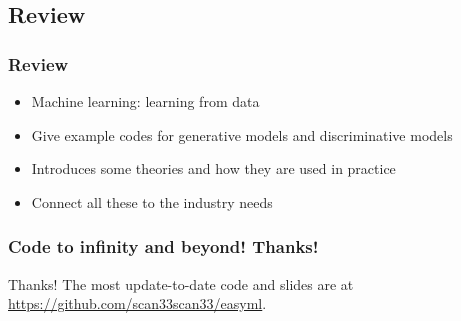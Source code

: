 \documentclass{beamer}
\begin{document}
\subsection{Review}
\begin{frame}
  \frametitle{Review}
  \begin{itemize}
  \item Machine learning: learning from data
  \item Give example codes for generative models and discriminative models
  \item Introduces some theories and how they are used in practice
  \item Connect all these to the industry needs
  \end{itemize}
\end{frame}

\begin{frame}
\frametitle{Code to infinity and beyond! Thanks!}

Thanks! The most update-to-date code and slides are at\\
	    \url{https://github.com/scan33scan33/easyml}.\\ 
\end{frame}
\end{document}
